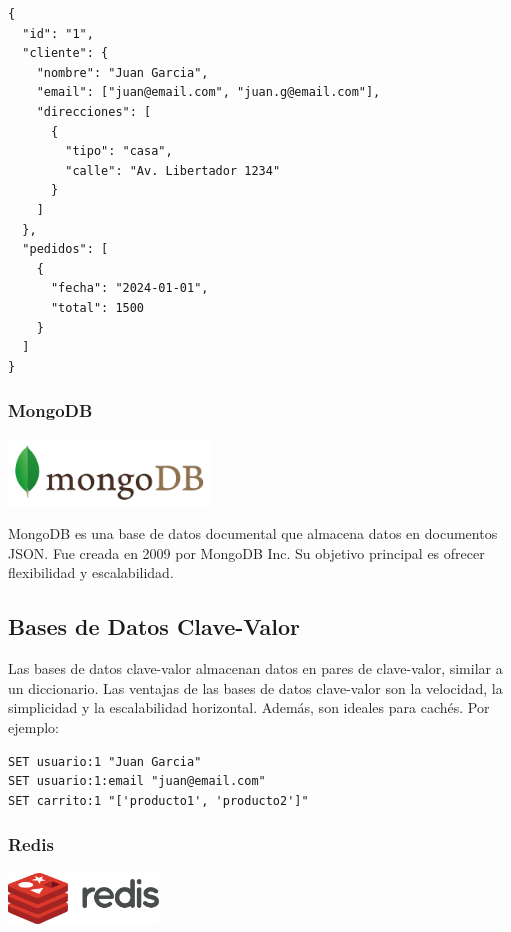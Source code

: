 \documentclass[12pt]{article}
\begin{document}
\begin{lstlisting}
{
  "id": "1",
  "cliente": {
    "nombre": "Juan Garcia",
    "email": ["juan@email.com", "juan.g@email.com"],
    "direcciones": [
      {
        "tipo": "casa",
        "calle": "Av. Libertador 1234"
      }
    ]
  },
  "pedidos": [
    {
      "fecha": "2024-01-01",
      "total": 1500
    }
  ]
}
\end{lstlisting}

\subsubsection{MongoDB}

\begin{center}
  \includegraphics[width=0.4\textwidth]{images/Mongodb.png}
\end{center}

MongoDB es una base de datos documental que almacena datos en documentos JSON. Fue creada en 2009 por MongoDB Inc. Su objetivo principal es ofrecer flexibilidad y escalabilidad.

\subsection{Bases de Datos Clave-Valor}

Las bases de datos clave-valor almacenan datos en pares de clave-valor, similar a un diccionario. Las ventajas de las bases de datos clave-valor son la velocidad, la simplicidad y la escalabilidad horizontal. Además, son ideales para cachés. Por ejemplo:

\begin{lstlisting}
SET usuario:1 "Juan Garcia"
SET usuario:1:email "juan@email.com"
SET carrito:1 "['producto1', 'producto2']"
\end{lstlisting}

\subsubsection{Redis}

\begin{center}
  \includegraphics[width=0.3\textwidth]{images/Redis.png}
\end{center}
\end{document}
